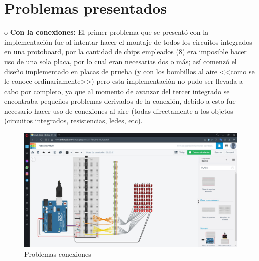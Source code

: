 \documentclass{article}
\begin{document}
\section{Problemas presentados} \label{contenido}
o	\textbf{Con la conexiones:} El primer problema que se presentó con la implementación fue al intentar hacer el montaje de todos los circuitos integrados en una protoboard, por la cantidad de chips empleados (8) era imposible hacer uso de una sola placa, por lo cual eran necesarias dos o más; así comenzó el diseño implementado en placas de prueba (y con los bombillos al aire <<como se le conoce ordinariamente>>) pero esta implementación no pudo ser llevada a cabo por completo, ya que al momento de avanzar del tercer integrado se encontraba pequeños problemas derivados de la conexión, debido a esto fue necesario hacer uso de conexiones al aire (todas directamente a los objetos (circuitos integrados, resistencias, ledes, etc).\par
\begin{figure}[H]
\includegraphics[width=12cm]{protoboard.jpg}
\centering
\caption{Problemas conexiones}
\label{fig:protoboard}
\end{figure}
\end{document}
